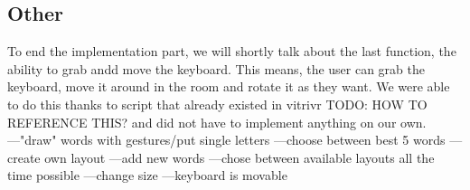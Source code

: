 \subsection{Other}
To end the implementation part, we will shortly talk about the last function, the ability to grab andd move the keyboard. This means, the user can grab the keyboard, move it around in the room and rotate it as they want. We were able to do this thanks to script that already existed in vitrivr TODO: HOW TO REFERENCE THIS? and did not have to implement anything on our own.\\



---"draw" words with gestures/put single letters
---choose between best 5 words
---create own layout
---add new words
---chose between available layouts all the time possible
---change size
---keyboard is movable
